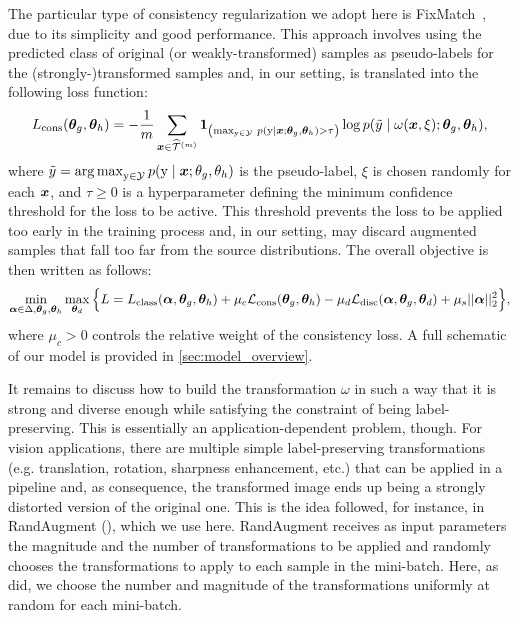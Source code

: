 The particular type of consistency regularization we adopt here is FixMatch~\citep{Sohn2020}, due to its simplicity and good performance. This approach involves using the predicted class of original (or weakly-transformed) samples as pseudo-labels for the (strongly-)transformed samples and, in our setting, is translated into the following loss function:
\begin{equation}
L_{\text{cons}}({\bm{\theta}}_g, {\bm{\theta}}_h) = -\frac{1}{m}\sum_{{\bm{x}} \in \widehat{{\mathcal{T}}}^{(m)}} \bm{1}_{\left(\max_{{\textnormal{y}} \in {\mathcal{Y}}}\, p({\textnormal{y}} \mid {\bm{x}}; {\bm{\theta}}_g, {\bm{\theta}}_h) > \tau \right)} \log p(\tilde{y} \mid \omega({\bm{x}}, \xi); {\bm{\theta}}_g, {\bm{\theta}}_h),
\end{equation}
where $\tilde{y} = \operatorname*{arg\,max}_{{\textnormal{y}} \in {\mathcal{Y}}} p({\textnormal{y}} \mid {\bm{x}}; \theta_g, \theta_h)$ is the pseudo-label, $\xi$ is chosen randomly for each ${\bm{x}}$, and $\tau \geq 0$ is a hyperparameter defining the minimum confidence threshold for the loss to be active. This threshold prevents the loss to be applied too early in the training process and, in our setting, may discard augmented samples that fall too far from the source distributions. The overall objective is then written as follows:
\begin{equation}
\min_{{\bm{\alpha}} \in \Delta, {\bm{\theta}}_g, {\bm{\theta}}_h}\max_{{\bm{\theta}}_d} \Big\{ L = L_\text{class}({\bm{\alpha}}, {\bm{\theta}}_g, {\bm{\theta}}_h) + \mu_c {\mathcal{L}}_\text{cons}({\bm{\theta}}_g, {\bm{\theta}}_h) - \mu_d {\mathcal{L}}_\text{disc}({\bm{\alpha}}, {\bm{\theta}}_g, {\bm{\theta}}_d) + \mu_s ||{\bm{\alpha}}||_2^2 \Big\}, 
\end{equation}
where $\mu_c > 0$ controls the relative weight of the consistency loss. A full schematic of our model is provided in \ref{sec:model_overview}.

It remains to discuss how to build the transformation $\omega$ in such a way that it is strong and diverse enough while satisfying the constraint of being label-preserving. This is essentially an application-dependent problem, though. For vision applications, there are multiple simple label-preserving transformations (e.g. translation, rotation, sharpness enhancement, etc.) that can be applied in a pipeline and, as consequence, the transformed image ends up being a strongly distorted version of the original one. This is the idea followed, for instance, in RandAugment (\citet{Cubuk2019}), which we use here. RandAugment receives as input parameters the magnitude and the number of transformations to be applied and randomly chooses the transformations to apply to each sample in the mini-batch. Here, as \citet{Sohn2020} did, we choose the number and magnitude of the transformations uniformly at random for each mini-batch.

